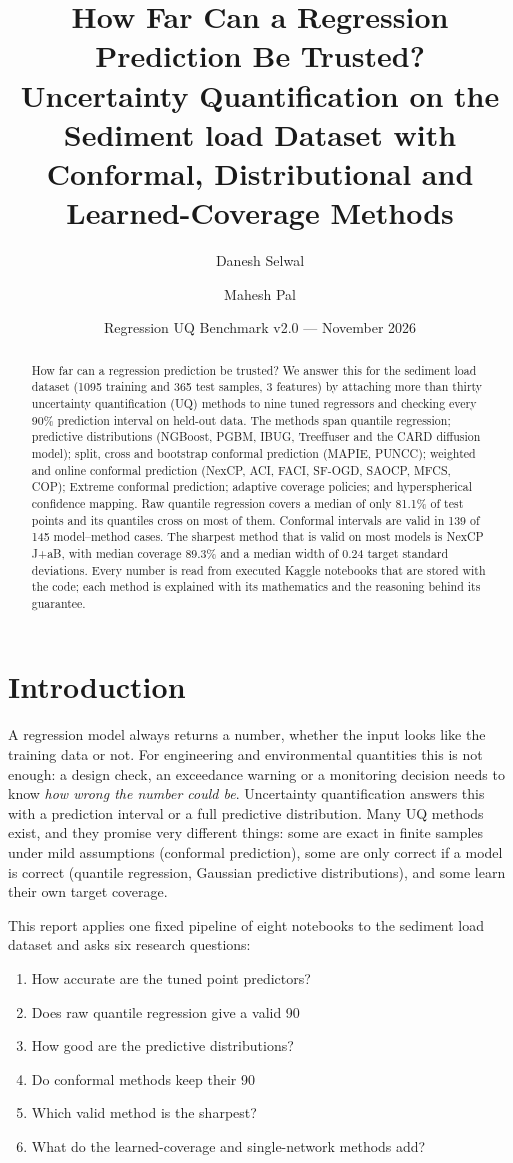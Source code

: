 \documentclass[11pt]{article}
\title{How Far Can a Regression Prediction Be Trusted?\\[2pt] \large Uncertainty Quantification on the Sediment load Dataset with Conformal, Distributional and Learned-Coverage Methods}
\author{Danesh Selwal \and Mahesh Pal}
\date{Regression UQ Benchmark v2.0 --- November 2026}
\begin{document}
\maketitle
\begin{abstract}How far can a regression prediction be trusted? We answer this for the sediment load dataset (1095 training and 365 test samples, 3 features) by attaching more than thirty uncertainty quantification (UQ) methods to nine tuned regressors and checking every 90\% prediction interval on held-out data. The methods span quantile regression; predictive distributions (NGBoost, PGBM, IBUG, Treeffuser and the CARD diffusion model); split, cross and bootstrap conformal prediction (MAPIE, PUNCC); weighted and online conformal prediction (NexCP, ACI, FACI, SF-OGD, SAOCP, MFCS, COP); Extreme conformal prediction; adaptive coverage policies; and hyperspherical confidence mapping. Raw quantile regression covers a median of only 81.1\% of test points and its quantiles cross on most of them. Conformal intervals are valid in 139 of 145 model--method cases. The sharpest method that is valid on most models is NexCP J+aB, with median coverage 89.3\% and a median width of 0.24 target standard deviations. Every number is read from executed Kaggle notebooks that are stored with the code; each method is explained with its mathematics and the reasoning behind its guarantee.\end{abstract}
\tableofcontents
\newpage
\section{Introduction}
A regression model always returns a number, whether the input looks like the training data or not. For engineering and environmental
quantities this is not enough: a design check, an exceedance warning or a monitoring decision needs to know \emph{how wrong the number could be}.
Uncertainty quantification answers this with a prediction interval or a full predictive distribution. Many UQ methods exist, and they
promise very different things: some are exact in finite samples under mild assumptions (conformal prediction), some are only correct if a
model is correct (quantile regression, Gaussian predictive distributions), and some learn their own target coverage.

This report applies one fixed pipeline of eight notebooks to the sediment load dataset and asks six research questions:
\begin{enumerate}[label=\textbf{RQ\arabic*.}]
\item How accurate are the tuned point predictors?
\item Does raw quantile regression give a valid 90%
\item How good are the predictive distributions?
\item Do conformal methods keep their 90%
\item Which valid method is the sharpest?
\item What do the learned-coverage and single-network methods add?
\end{enumerate}
\end{document}
